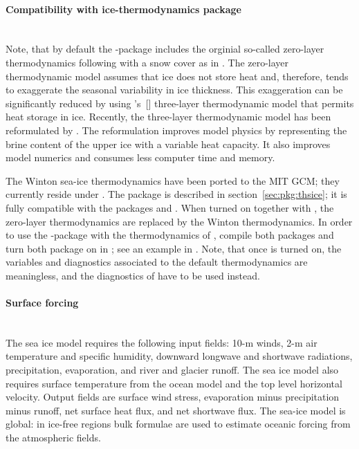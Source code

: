 \paragraph{Compatibility with ice-thermodynamics package \label{sec:pkg:seaice:thsice}}~\\
%
Note, that by default the -package includes the orginial
so-called zero-layer thermodynamics following \citet{hib80} with a
snow cover as in \citet{zha98a}. The zero-layer thermodynamic model
assumes that ice does not store heat and, therefore, tends to
exaggerate the seasonal variability in ice thickness.  This
exaggeration can be significantly reduced by using
\citeauthor{sem76}'s~[\citeyear{sem76}] three-layer thermodynamic
model that permits heat storage in ice. Recently, the three-layer thermodynamic model has been reformulated by
\citet{win00}.  The reformulation improves model physics by
representing the brine content of the upper ice with a variable heat
capacity.  It also improves model numerics and consumes less computer
time and memory. 

The Winton sea-ice thermodynamics have been ported to the MIT GCM;
they currently reside under .  The package
 is described in section~\ref{sec:pkg:thsice}; it is
fully compatible with the packages  and . When
turned on together with , the zero-layer thermodynamics
are replaced by the Winton thermodynamics. In order to use the
-package with the thermodynamics of ,
compile both packages and turn both package on in ; see
an example in . Note, that
once  is turned on, the variables and diagnostics
associated to the default thermodynamics are meaningless, and the
diagnostics of  have to be used instead.

\paragraph{Surface forcing\label{sec:pkg:seaice:surfaceforcing}}~\\
%
The sea ice model requires the following input fields: 10-m winds, 2-m
air temperature and specific humidity, downward longwave and shortwave
radiations, precipitation, evaporation, and river and glacier runoff.
The sea ice model also requires surface temperature from the ocean
model and the top level horizontal velocity.  Output fields are
surface wind stress, evaporation minus precipitation minus runoff, net
surface heat flux, and net shortwave flux.  The sea-ice model is
global: in ice-free regions bulk formulae are used to estimate oceanic
forcing from the atmospheric fields.

